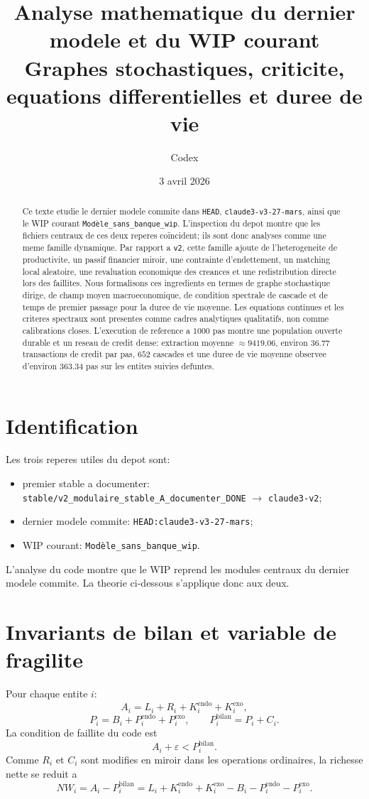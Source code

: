 \documentclass[11pt,a4paper]{article}
\title{Analyse mathematique du dernier modele et du WIP courant\\
\large Graphes stochastiques, criticite, equations differentielles et duree de vie}
\author{Codex}
\date{3 avril 2026}
\begin{document}
\maketitle

\begin{abstract}
Ce texte etudie le dernier modele commite dans \texttt{HEAD}, \texttt{claude3-v3-27-mars}, ainsi que le WIP courant \texttt{Modèle\_sans\_banque\_wip}. L'inspection du depot montre que les fichiers centraux de ces deux reperes coïncident; ils sont donc analyses comme une meme famille dynamique. Par rapport a \texttt{v2}, cette famille ajoute de l'heterogeneite de productivite, un passif financier miroir, une contrainte d'endettement, un matching local aleatoire, une revaluation economique des creances et une redistribution directe lors des faillites. Nous formalisons ces ingredients en termes de graphe stochastique dirige, de champ moyen macroeconomique, de condition spectrale de cascade et de temps de premier passage pour la duree de vie moyenne. Les equations continues et les criteres spectraux sont presentes comme cadres analytiques qualitatifs, non comme calibrations closes. L'execution de reference a $1000$ pas montre une population ouverte durable et un reseau de credit dense: extraction moyenne $\approx 9419.06$, environ $36.77$ transactions de credit par pas, $652$ cascades et une duree de vie moyenne observee d'environ $363.34$ pas sur les entites suivies defuntes.
\end{abstract}

\section{Identification}
Les trois reperes utiles du depot sont:
\begin{itemize}
\item premier stable a documenter: \texttt{stable/v2\_modulaire\_stable\_A\_documenter\_DONE} $\to$ \texttt{claude3-v2};
\item dernier modele commite: \texttt{HEAD:claude3-v3-27-mars};
\item WIP courant: \texttt{Modèle\_sans\_banque\_wip}.
\end{itemize}

L'analyse du code montre que le WIP reprend les modules centraux du dernier modele commite. La theorie ci-dessous s'applique donc aux deux.

\section{Invariants de bilan et variable de fragilite}
Pour chaque entite $i$:
\[
A_i = L_i + R_i + K_i^{\mathrm{endo}} + K_i^{\mathrm{exo}},
\]
\[
P_i = B_i + P_i^{\mathrm{endo}} + P_i^{\mathrm{exo}},
\qquad
P_i^{\mathrm{bilan}} = P_i + C_i.
\]
La condition de faillite du code est
\[
A_i + \varepsilon < P_i^{\mathrm{bilan}}.
\]
Comme $R_i$ et $C_i$ sont modifies en miroir dans les operations ordinaires, la richesse nette se reduit a
\[
NW_i = A_i - P_i^{\mathrm{bilan}}
= L_i + K_i^{\mathrm{endo}} + K_i^{\mathrm{exo}} - B_i - P_i^{\mathrm{endo}} - P_i^{\mathrm{exo}}.
\]
\end{document}
